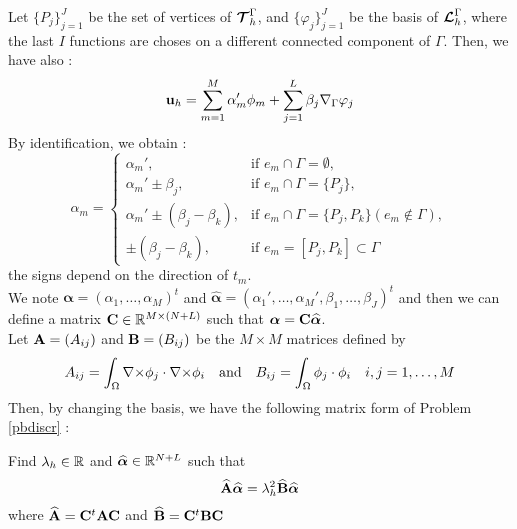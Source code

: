 Let $\{P_j\}_{j=1}^J$ be the set of vertices of ${\bm{\mathcal{T}}}_h^\Gamma$, and
$\{\varphi_j\}_{j=1}^J$ be the basis of ${\bm{\mathcal{L}}}_h^\Gamma$, where the last $I$
functions are choses on a different connected component of $\Gamma$. Then, we have also :
\[ {\mathbf{u}}_h = \sum_{m=1}^M \alpha_m'\phi_m + \sum_{j=1}^L
\beta_j{\nabla}_\Gamma\varphi_j \]
By identification, we obtain :
\[
\alpha_m=\begin{cases}
\alpha_m', &\mbox{if } e_m\cap\Gamma = \emptyset,\\
\alpha_m'\pm \beta_j, &\mbox{if } e_m\cap\Gamma = \{P_j\},\\
\alpha_m'\pm (\beta_j-\beta_k), &\mbox{if } e_m\cap\Gamma = \{P_j,P_k\}
(e_m\notin\Gamma),\\
\pm (\beta_j-\beta_k), &\mbox{if } e_m=[P_j,P_k]\subset\Gamma
\end{cases}
\]
the signs depend on the direction of $t_m$.\\

We note $\bm{\alpha}=(\alpha_1,\dots,\alpha_M)^t$ and
$\widehat{\bm{\alpha}}=(\alpha_1',\dots,\alpha_M',\beta_1,\dots,\beta_J)^t$ and
then we can define a matrix ${\mathbf{C}}\in{\mathbb{R}}^{M\times(N+L)}$ such that $\bm{\alpha}={\mathbf{C}}\widehat{\bm{\alpha}}$.\\

Let ${\mathbf{A}}=(A_{ij})$ and ${\mathbf{B}}=(B_{ij})$ be the $M\times M$ matrices defined
by 
\[A_{ij}=\int_\Omega {\nabla\times}\phi_j\cdot{\nabla\times}\phi_i \quad\mbox{and}\quad
B_{ij}=\int_\Omega\phi_j\cdot\phi_i\quad i,j=1,\dots,M \]
Then, by changing the basis, we have the following matrix form of Problem
\ref{pbdiscr} :
\begin{pb}\label{pbmat}
Find $\lambda_h\in{\mathbb{R}}$ and $\widehat{\bm{\alpha}}\in{\mathbb{R}}^{N+L}$ such that
\[ \widehat{{\mathbf{A}}}\widehat{\bm{\alpha}} =
\lambda_h^2\widehat{{\mathbf{B}}}\widehat{\bm{\alpha}} \]
where $\widehat{{\mathbf{A}}}={\mathbf{C}}^t{\mathbf{A}}{\mathbf{C}}$ and $\widehat{{\mathbf{B}}}={\mathbf{C}}^t{\mathbf{B}}{\mathbf{C}}$
\end{pb}

